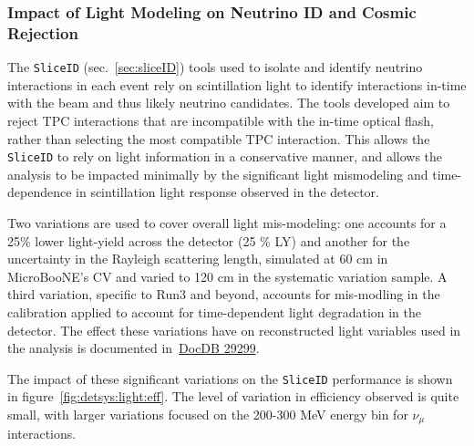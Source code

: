 \subsubsection{Impact of Light Modeling on Neutrino ID and Cosmic Rejection} 
\label{sec:detsys:light}
The \texttt{SliceID} (sec.~\ref{sec:sliceID}) tools used to isolate and identify neutrino interactions in each event rely on scintillation light to identify interactions in-time with the beam and thus likely neutrino candidates. The tools developed aim to reject TPC interactions that are incompatible with the in-time optical flash, rather than selecting the most compatible TPC interaction. This allows the \texttt{SliceID} to rely on light information in a conservative manner, and allows the analysis to be impacted minimally by the significant light mismodeling and time-dependence in scintillation light response observed in the detector. 
\par Two variations are used to cover overall light mis-modeling: one accounts for a 25\% lower light-yield across the detector (25 \% LY) and another for the uncertainty in the Rayleigh scattering length, simulated at 60 cm in MicroBooNE's CV and varied to 120 cm in the systematic variation sample. A third variation, specific to Run3 and beyond, accounts for mis-modling in the calibration applied to account for time-dependent light degradation in the detector. The effect these variations have on reconstructed light variables used in the analysis is documented in~\href{https://microboone-docdb.fnal.gov/cgi-bin/private/ShowDocument?docid=29299}{DocDB 29299}.

\par The impact of these significant variations on the \texttt{SliceID} performance is shown in figure~\ref{fig:detsys:light:eff}. The level of variation in efficiency observed is quite small, with larger variations focused on the 200-300 MeV energy bin for $\nu_{\mu}$ interactions.


